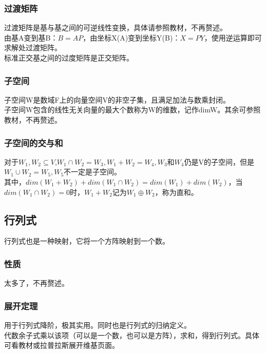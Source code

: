 \documentclass[UTF8]{ctexart}
\begin{document}
\subsubsection{过渡矩阵}
过渡矩阵是基与基之间的可逆线性变换，具体请参照教材，不再赘述。\\
\indent
由基A变到基B：$B=AP$，由坐标X(A)变到坐标Y(B)：$X=PY$，使用逆运算即可求解处过渡矩阵。\\
\indent
标准正交基之间的过度矩阵是正交矩阵。
\subsubsection{子空间}
子空间W是数域F上的向量空间V的非空子集，且满足加法与数乘封闭。\\
\indent
子空间W包含的线性无关向量的最大个数称为W的维数，记作dimW。其余可参照教材，不再赘述。
\subsubsection{子空间的交与和}
对于$W_1,W_2\subseteq V$,$W_1\cap W_2=W_3,W_1+W_2=W_4,W_3$和$W_4$仍是V的子空间，但是$W_1\cup W_2=W_5,W_5$不一定是子空间。\\
\indent
其中，$dim(W_1+W_2)+dim(W_1\cap W_2)=dim(W_1)+dim(W_2)$，当$dim(W_1\cap W_2)=0$时，$W_1+W_2$记为$W_1\oplus W_2$，称为直和。\\
\subsection{行列式}
行列式也是一种映射，它将一个方阵映射到一个数。\\
\indent
\subsubsection{性质}
太多了，不再赘述。
\subsubsection{展开定理}
用于行列式降阶，极其实用。同时也是行列式的归纳定义。\\
\indent
代数余子式乘以该项（可以是一个数，也可以是方阵），求和，得到行列式。具体可看教材或拉普拉斯展开维基页面。
\end{document}
